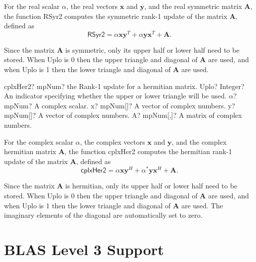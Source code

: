 \vspace{0.3cm}
For the real scalar $\alpha$, the real vectors $\boldsymbol{x}$ and $\boldsymbol{y}$, and the real symmetric matrix $\boldsymbol{A}$, the function \textsf{RSyr2} computes the symmetric rank-1 update of the matrix $\boldsymbol{A}$, defined as
\begin{equation}
\textsf{RSyr2}= \alpha \boldsymbol{x} \boldsymbol{y}^T +  \alpha \boldsymbol{y} \boldsymbol{x}^T +\boldsymbol{A}.
\end{equation}

Since the matrix $\boldsymbol{A}$ is symmetric, only its upper half or lower half need to be stored. When \textsf{Uplo} is 0 then the upper triangle and diagonal of $\boldsymbol{A}$ are used, and when \textsf{Uplo} is 1 then the lower triangle and diagonal of $\boldsymbol{A}$ are used. 


\vspace{0.6cm}
\begin{mpFunctionsExtract}
	\mpFunctionFive
	{cplxHer2? mpNum? the Rank-1 update for a hermitian matrix.}
	{Uplo? Integer? An indicator specifying whether the upper or lower triangle will be used.}
	{$\alpha$? mpNum? A complex scalar.}
	{x? mpNum[]? A vector of complex numbers.}
	{y? mpNum[]? A vector of complex numbers.}
	{A? mpNum[,]? A matrix of complex numbers.}
\end{mpFunctionsExtract}

\vspace{0.3cm}
For the complex scalar $\alpha$, the complex vectors $\boldsymbol{x}$ and $\boldsymbol{y}$, and the complex hermitian matrix $\boldsymbol{A}$, the function \textsf{cplxHer2} computes the hermitian rank-1 update of the matrix $\boldsymbol{A}$, defined as
\begin{equation}
\textsf{cplxHer2}=  \alpha \boldsymbol{x} \boldsymbol{y}^H +  \alpha^* \boldsymbol{y} \boldsymbol{x}^H +\boldsymbol{A}.
\end{equation}

Since the matrix $\boldsymbol{A}$ is hermitian, only its upper half or lower half need to be stored. When \textsf{Uplo} is 0 then the upper triangle and diagonal of $\boldsymbol{A}$ are used, and when \textsf{Uplo} is 1 then the lower triangle and diagonal of $\boldsymbol{A}$ are used. 
The imaginary elements of the diagonal are automatically set to zero. 






\section{BLAS Level 3 Support}
\label{BLASSupportLevel3}


